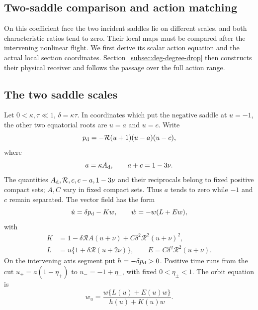 \subsection{Two-saddle comparison and action matching}
\label{sec:two-saddle-comparison}

On this coefficient face the two incident saddles lie on different
scales, and both characteristic ratios tend to zero. Their local maps
must be compared after the intervening nonlinear flight. We first derive
its scalar action equation and the actual local section coordinates.
Section~\ref{subsec:deg-degree-drop} then constructs their physical
receiver and follows the passage over the full action range.

\subsection{The two saddle scales}

Let \(0<\kappa,\tau\ll1\), \(\delta=\kappa\tau\). In coordinates
which put the negative saddle at \(u=-1\), the other two equatorial
roots are \(u=a\) and \(u=c\). Write
\begin{equation}\label{fx:pd}
 p_{\rm d}=-\mathcal R(u+1)(u-a)(u-c),
\end{equation}
where
\begin{equation}\label{fx:coefficient-graph}
 a=\kappa A_{\rm d},\qquad a+c=1-3\nu .
\end{equation}
The quantities \(A_{\rm d},\mathcal R,c,c-a,1-3\nu\) and their
reciprocals belong to fixed positive compact sets; \(A,C\) vary in
fixed compact sets. Thus \(a\) tends to zero while \(-1\) and \(c\)
remain separated. The vector field has the form
\[
 \dot u=\delta p_{\rm d}-Kw,\qquad
 \dot w=-w(L+Ew),
\]
with
\begin{equation}\label{fx:coefficients}
\begin{aligned}
 K&=1-\delta\mathcal R A(u+\nu)
              +C\delta^2\mathcal R^2(u+\nu)^2,\\
 L&=u\{1+\delta\mathcal R(u+2\nu)\},\qquad
 E=C\delta^2\mathcal R^2(u+\nu).
\end{aligned}
\end{equation}
On the intervening axis segment put \(h=-\delta p_{\rm d}>0\).
Positive time runs from the cut \(u_+=a(1-\eta_+)\) to
\(u_-=-1+\eta_-\), with fixed \(0<\eta_\pm<1\). The orbit equation is
\begin{equation}\label{fx:graph}
 w_u=\frac{w\{L(u)+E(u)w\}}{h(u)+K(u)w}.
\end{equation}

